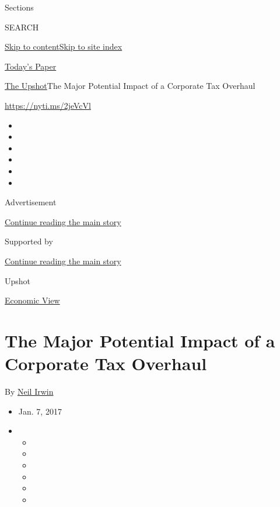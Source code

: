 Sections

SEARCH

\protect\hyperlink{site-content}{Skip to
content}\protect\hyperlink{site-index}{Skip to site index}

\href{https://myaccount.nytimes.com/auth/login?response_type=cookie\&client_id=vi}{}

\href{https://www.nytimes.com/section/todayspaper}{Today's Paper}

\href{/section/upshot}{The Upshot}\textbar{}The Major Potential Impact
of a Corporate Tax Overhaul

\url{https://nyti.ms/2jeVcVl}

\begin{itemize}
\item
\item
\item
\item
\item
\item
\end{itemize}

Advertisement

\protect\hyperlink{after-top}{Continue reading the main story}

Supported by

\protect\hyperlink{after-sponsor}{Continue reading the main story}

Upshot

\href{/column/economic-view}{Economic View}

\hypertarget{the-major-potential-impact-of-a-corporate-tax-overhaul}{%
\section{The Major Potential Impact of a Corporate Tax
Overhaul}\label{the-major-potential-impact-of-a-corporate-tax-overhaul}}

By \href{http://www.nytimes.com/by/neil-irwin}{Neil Irwin}

\begin{itemize}
\item
  Jan. 7, 2017
\item
  \begin{itemize}
  \item
  \item
  \item
  \item
  \item
  \item
  \end{itemize}
\end{itemize}

